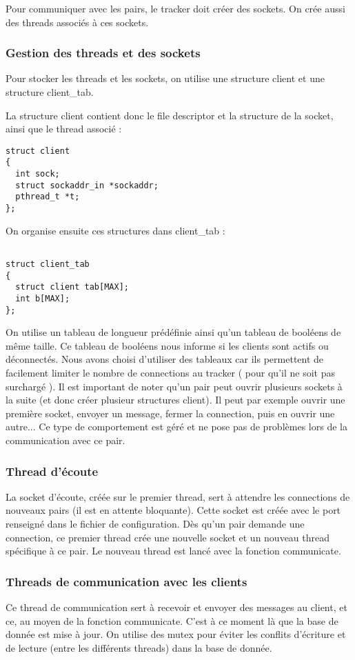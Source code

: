 Pour communiquer avec les pairs, le tracker doit créer des sockets. On crée aussi des threads associés à ces sockets.
\subsubsection{Gestion des threads et des sockets}
Pour stocker les threads et les sockets, on utilise une structure client et une structure client\_tab.

La structure client contient donc le file descriptor et la structure de la socket, ainsi que le thread associé :
\begin{verbatim}
struct client
{
  int sock;
  struct sockaddr_in *sockaddr;
  pthread_t *t; 
};
\end{verbatim}
On organise ensuite ces structures dans client\_tab :
\begin{verbatim}

struct client_tab
{
  struct client tab[MAX];
  int b[MAX];
};
\end{verbatim}
On utilise un tableau de longueur prédéfinie ainsi qu'un tableau de booléens de même taille. Ce tableau de booléens nous informe si les clients sont actifs ou déconnectés.
Nous avons choisi d'utiliser des tableaux car ils permettent de facilement limiter le nombre de connections au tracker ( pour qu'il ne soit pas surchargé ). Il est important de noter qu'un pair peut ouvrir plusieurs sockets à la suite (et donc créer plusieur structures client). Il peut par exemple ouvrir une première socket, envoyer un message, fermer la connection, puis en ouvrir une autre... Ce type de comportement est géré et ne pose pas de problèmes lors de la communication avec ce pair.

\subsubsection{Thread d'écoute}
La socket d'écoute, créée sur le premier thread, sert à attendre les connections de nouveaux pairs (il est en attente bloquante). Cette socket est créée avec le port renseigné dans le fichier de configuration. Dès qu'un pair demande une connection, ce premier thread crée une nouvelle socket et un nouveau thread spécifique à ce pair.
Le nouveau thread est lancé avec la fonction communicate.
\subsubsection{Threads de communication avec les clients}
Ce thread de communication sert à recevoir et envoyer des messages au client, et ce, au moyen de la fonction communicate. C'est à ce moment là que la base de donnée est mise à jour. On utilise des mutex pour éviter les conflits d'écriture et de lecture (entre les différents threads) dans la base de donnée.\\ 

